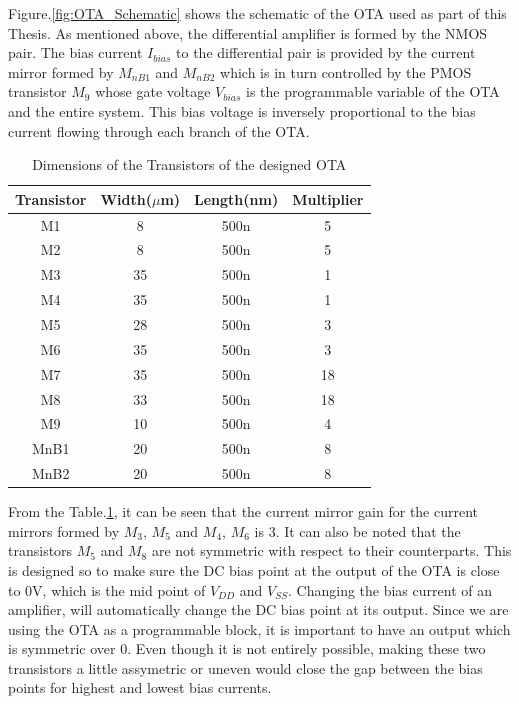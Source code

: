 Figure.\ref{fig:OTA_Schematic} shows the schematic of the OTA used as part of this Thesis. As mentioned above, the differential amplifier is formed by the NMOS pair. The bias current $I_{bias}$ to the differential pair is provided by the current mirror formed by $M_{nB1}$ and $M_{nB2}$ which is in turn controlled by the PMOS transistor $M_9$ whose gate voltage $V_{bias}$ is the programmable variable of the OTA and the entire system. This bias voltage is inversely proportional to the bias current flowing through each branch of the OTA.

\begin{table} [H]
\centering
\begin{tabular}{@{}cccc@{}}
\toprule
Transistor			& Width($\mu$m)		& Length(nm)		& Multiplier \\ \midrule
M1					& 8					& 500n				& 5			\\
M2					& 8					& 500n				& 5			\\
M3					& 35				& 500n				& 1			\\
M4					& 35				& 500n				& 1			\\
M5					& 28				& 500n				& 3			\\
M6					& 35				& 500n				& 3			\\
M7					& 35				& 500n				& 18		\\
M8					& 33				& 500n				& 18		\\
M9					& 10				& 500n				& 4			\\
MnB1				& 20				& 500n				& 8			\\
MnB2				& 20				& 500n				& 8			\\
\bottomrule
\end{tabular}
\caption{Dimensions of the Transistors of the designed OTA}
\label{tab:OTA_dimensions}
\end{table}
From the Table.\ref{tab:OTA_dimensions}, it can be seen that the current mirror gain for the current mirrors formed by $M_{3}$, $M_{5}$ and $M_{4}$, $M_{6}$ is 3. It can also be noted that the transistors $M_{5}$ and $M_{8}$ are not symmetric with respect to their counterparts. This is designed so to make sure the DC bias point at the output of the OTA is close to 0V, which is the mid point of $V_{DD}$ and $V_{SS}$. Changing the bias current of an amplifier, will automatically change the DC bias point at its output. Since we are using the OTA as a programmable block, it is important to have an output which is symmetric over 0. Even though it is not entirely possible, making these two transistors a little assymetric or uneven would close the gap between the bias points for highest and lowest bias currents.

